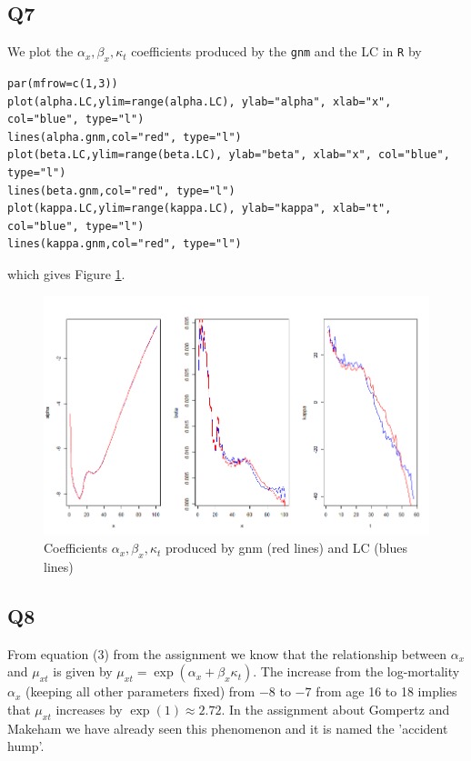 \documentclass[11pt]{article}
\begin{document}
\subsection*{Q7}

We plot the $\alpha_x, \beta_x, \kappa_t$ coefficients produced by the \verb|gnm| and the LC in \verb|R| by

\begin{verbatim}
par(mfrow=c(1,3))
plot(alpha.LC,ylim=range(alpha.LC), ylab="alpha", xlab="x", col="blue", type="l")
lines(alpha.gnm,col="red", type="l")
plot(beta.LC,ylim=range(beta.LC), ylab="beta", xlab="x", col="blue", type="l")
lines(beta.gnm,col="red", type="l")
plot(kappa.LC,ylim=range(kappa.LC), ylab="kappa", xlab="t", col="blue", type="l")
lines(kappa.gnm,col="red", type="l")
\end{verbatim}
which gives Figure \ref{Figure_Question7}.
\begin{center}
	\begin{figure}[H]
		
		\includegraphics[scale=0.75]{NL3_Question7.png}
		
		\caption{Coefficients $\alpha_x, \beta_x, \kappa_t$ produced by gnm (red lines) and LC (blues lines) }
		\label{Figure_Question7}
		
	\end{figure}
\end{center}

\subsection*{Q8}
From equation (3) from the assignment we know that the relationship between $\alpha_x$ and $\mu_{xt}$ is given by $\mu_{xt} = \exp(\alpha_x + \beta_x \kappa_t)$. The increase from the log-mortality $\alpha_x$ (keeping all other parameters fixed) from $-8$ to $-7$ from age 16 to 18 implies that $\mu_{xt}$ increases by $\exp(1) \approx 2.72$. In the assignment about Gompertz and Makeham we have already seen this phenomenon and it is named the 'accident hump'.
\end{document}
